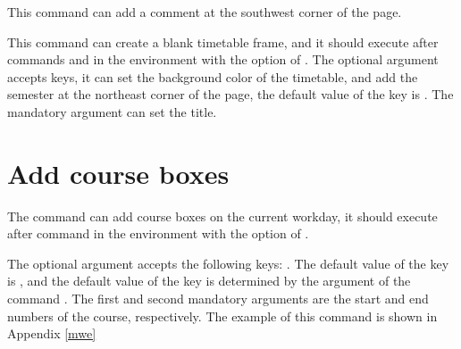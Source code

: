 \documentclass[letterpaper]{l3doc}
\begin{document}
\begin{function}{\more}
  \begin{syntax}
     
  \end{syntax}

  This command can add a comment at the southwest corner of the page.
\end{function}

\begin{function}{\maketable}
  \begin{syntax}
       
  \end{syntax}

  This command can create a blank timetable frame, and it should execute after commands  and  in the  environment with the option of . The optional argument accepts keys, it can set the background color of the timetable, and add the semester at the northeast corner of the page, the default value of the key  is . The mandatory argument can set the title.
\end{function}

\section{Add course boxes}

\begin{function}{\course}
  \begin{syntax}
         
  \end{syntax}
\end{function}

The  command can add course boxes on the current workday, it should execute after command  in the  environment with the option of .

The optional argument accepts the following keys:     . The default value of the key  is , and the default value of the key  is determined by the argument of the command . The first and second mandatory arguments are the start and end numbers of the course, respectively.  The example of this command is shown in Appendix \ref{mwe}
\end{document}
